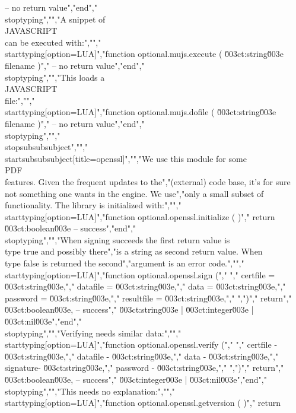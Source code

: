 -- no return value","end","\\stoptyping","","A snippet of \\JAVASCRIPT\\ can be executed with:","","\\starttyping[option=LUA]","function optional.mujs.execute ( \u003ct:string\u003e filename )","    -- no return value","end","\\stoptyping","","This loads a \\JAVASCRIPT\\ file:","","\\starttyping[option=LUA]","function optional.mujs.dofile ( \u003ct:string\u003e filename )","    -- no return value","end","\\stoptyping","","\\stopsubsubsubject","","\\startsubsubsubject[title=openssl]","","We use this module for some \\PDF\\ features. Given the frequent updates to the","(external) code base, it's for sure not something one wants in the engine. We use","only a small subset of functionality. The library is initialized with:","","\\starttyping[option=LUA]","function optional.openssl.initialize ( )","    return \u003ct:boolean\u003e -- success","end","\\stoptyping","","When signing succeeds the first return value is \\type {true} and possibly there","is a string as second return value. When \\type {false} is returned the second","argument is an error code.","","\\starttyping[option=LUA]","function optional.openssl.sign (","    {","        certfile   = \u003ct:string\u003e,","        datafile   = \u003ct:string\u003e,","        data       = \u003ct:string\u003e,","        password   = \u003ct:string\u003e,","        resultfile = \u003ct:string\u003e,","    }",")","    return","        \u003ct:boolean\u003e, -- success","        \u003ct:string\u003e | \u003ct:integer\u003e | \u003ct:nil\u003e","end","\\stoptyping","","Verifying needs similar data:","","\\starttyping[option=LUA]","function optional.openssl.verify (","    {","        certfile - \u003ct:string\u003e,","        datafile - \u003ct:string\u003e,","        data     - \u003ct:string\u003e,","        signature- \u003ct:string\u003e,","        password - \u003ct:string\u003e,","    }",")","    return","        \u003ct:boolean\u003e, -- success","        \u003ct:integer\u003e | \u003ct:nil\u003e","end","\\stoptyping","","This needs no explanation:","","\\starttyping[option=LUA]","function optional.openssl.getversion ( )","    return 